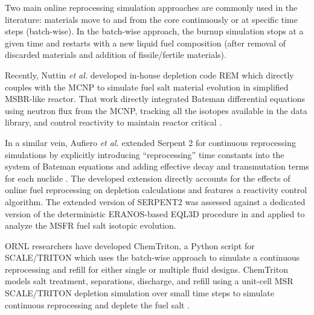 Two main online reprocessing simulation approaches are commonly used in the 
literature: materials move to and from the core continuously or at specific 
time steps (batch-wise). In the batch-wise approach, the burnup simulation 
stops at a given time and restarts with a new liquid fuel composition 
(after removal of discarded materials and addition of fissile/fertile 
materials).

Recently, Nuttin \emph{et al.} developed in-house 
depletion code REM which directly couples with the \gls{MCNP}  
\cite{noauthor_mcnp_2004} to simulate fuel salt material evolution in 
simplified \gls{MSBR}-like reactor. That work directly integrated
Bateman differential equations using neutron flux from the \gls{MCNP}, 
tracking all the isotopes available in the data library, and control 
reactivity to maintain reactor critical \cite{nuttin_potential_2005}.

In a similar vein, Aufiero \emph{et al.} extended Serpent 2 for continuous 
reprocessing simulations by explicitly introducing ``reprocessing'' time 
constants into the system of Bateman equations and adding effective decay and 
transmutation terms for each nuclide \cite{aufiero_extended_2013}. The 
developed extension directly accounts for the effects of online fuel 
reprocessing on depletion calculations and features a reactivity control 
algorithm. The extended version of SERPENT2 was assessed against a dedicated 
version of the deterministic ERANOS-based EQL3D procedure in 
\cite{fiorina_investigation_2013} and applied to analyze the \gls{MSFR} fuel 
salt isotopic evolution.


\gls{ORNL} researchers have developed ChemTriton, a Python script for
SCALE/TRITON which uses the batch-wise approach to simulate a continuous 
reprocessing and refill for either single or multiple fluid designs. 
ChemTriton models salt treatment, separations, discharge, and refill using a 
unit-cell MSR SCALE/TRITON depletion simulation over small time steps to 
simulate continuous reprocessing and deplete the fuel salt 
\cite{powers_new_2013, betzler_fuel_2018}.

